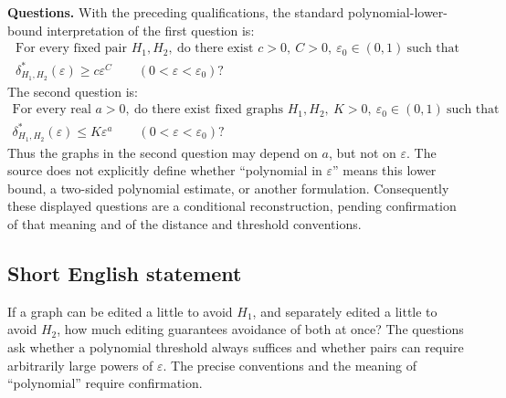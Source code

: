 \documentclass[11pt]{article}
\begin{document}
\textbf{Questions.} With the preceding qualifications, the standard polynomial-lower-bound interpretation of the first question is:
\[
\begin{gathered}
\text{For every fixed pair }H_1,H_2,\ \text{do there exist }c>0,\ C>0,\ \varepsilon_0\in(0,1)\ \text{such that}\\
\delta^*_{H_1,H_2}(\varepsilon)\geq c\varepsilon^C
\qquad(0<\varepsilon<\varepsilon_0)?
\end{gathered}
\]
The second question is:
\[
\begin{gathered}
\text{For every real }a>0,\ \text{do there exist fixed graphs }H_1,H_2,\ K>0,
\ \varepsilon_0\in(0,1)\ \text{such that}\\
\delta^*_{H_1,H_2}(\varepsilon)\leq K\varepsilon^a
\qquad(0<\varepsilon<\varepsilon_0)?
\end{gathered}
\]
Thus the graphs in the second question may depend on \(a\), but not on \(\varepsilon\). The source does not explicitly define whether ``polynomial in \(\varepsilon\)'' means this lower bound, a two-sided polynomial estimate, or another formulation. Consequently these displayed questions are a conditional reconstruction, pending confirmation of that meaning and of the distance and threshold conventions.
\subsection{Short English statement}
If a graph can be edited a little to avoid \(H_1\), and separately edited a little to avoid \(H_2\), how much editing guarantees avoidance of both at once? The questions ask whether a polynomial threshold always suffices and whether pairs can require arbitrarily large powers of \(\varepsilon\). The precise conventions and the meaning of ``polynomial'' require confirmation.
\end{document}
